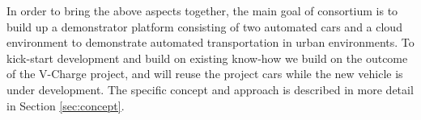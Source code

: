 
In order to bring the above aspects together, the main goal of \Project consortium is to build up a demonstrator platform consisting of two automated cars and a cloud environment to demonstrate automated transportation in urban environments. To kick-start development and build on existing know-how we build on the outcome of the V-Charge project, and will reuse the project cars while the new vehicle is under development. The specific concept and approach is described in more detail in Section \ref{sec:concept}. 

